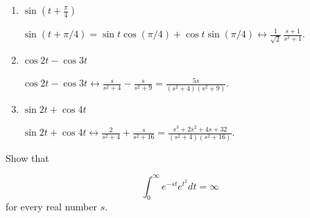 \documentclass{ximera}
\begin{document}
\begin{problem}
\begin{enumerate}
    \item $\sin\left(t+\frac{\pi}{4}\right)$
        
    \begin{solution}
$\sin(t+\pi/4)=\sin
t\cos(\pi/4)+\cos
t\sin(\pi/4)\leftrightarrow\frac{1}{\sqrt{2}}\,\frac{s+1}{s^2+1}$.
    \end{solution}
    
    \item $\cos 2t -\cos 3t$
        
    \begin{solution}
$\cos 2t -\cos 3t\leftrightarrow\frac{s}{s^2+4}-\frac{s}{s^2+9}=\frac{5s}{(s^2+4)(s^2+9)}$.
    \end{solution}
    
    \item $\sin 2t +\cos 4t$
        
    \begin{solution}
$\sin 2t +\cos4t\leftrightarrow\frac{2}{s^2+4}+\frac{s}{s^2+16} =\frac{s^3+2s^2+4s+32}{(s^2+4)(s^2+16)}$.
    \end{solution}
    
\end{enumerate}
\end{problem}

\begin{problem}\label{exer:8.1.3}
    Show that

    $$
\int_0^\infty e^{-st}e^{t^2} dt=\infty
$$
for every real number $s$.


\end{problem}
\end{document}
